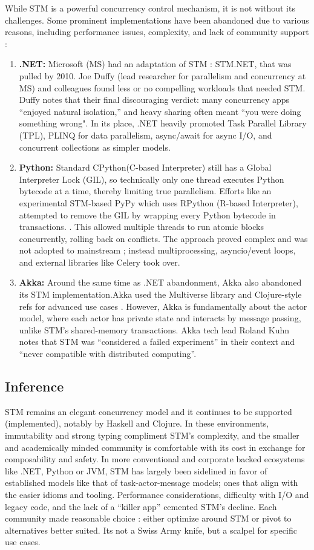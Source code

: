 While STM is a powerful concurrency control mechanism, it is not without its challenges. Some prominent implementations have been abandoned due to various reasons, including performance issues, complexity, and lack of community support :
\begin{enumerate}
    \item \textbf{.NET:}  Microsoft (MS) had an adaptation of STM :  STM.NET, that was pulled by 2010. Joe Duffy (lead researcher for parallelism and concurrency at MS) and colleagues found less or no compelling workloads that needed STM. Duffy notes that their final discouraging verdict: many concurrency apps “enjoyed natural isolation,” and heavy sharing often meant “you were doing something wrong"\cite{infoq.com}.  In its place, .NET heavily promoted Task Parallel Library (TPL), PLINQ for data parallelism, async/await for async I/O, and concurrent collections as simpler models.
    \item \textbf{Python:}  Standard CPython(C-based Interpreter) still has a Global Interpreter Lock (GIL), so technically only one thread executes Python bytecode at a time, thereby limiting true parallelism. Efforts like an experimental STM-based PyPy which uses RPython (R-based Interpreter), attempted to remove the GIL by wrapping every Python bytecode in transactions. \cite{pypy.org}. This allowed multiple threads to run atomic blocks concurrently, rolling back on conflicts. The approach proved complex and was not adopted to mainstream ; instead multiprocessing, asyncio/event loops, and external libraries like Celery took over.
    \item \textbf{Akka:} Around the same time as .NET abandonment, Akka also abandoned its STM implementation.Akka used the Multiverse library and Clojure-style refs for advanced use cases
    \cite{doc.akka.io}. However, Akka is fundamentally about the actor model, where each actor has private state and interacts by message passing, unlike STM’s shared-memory transactions. Akka tech lead Roland Kuhn notes that STM was “considered a failed experiment” in their context and “never compatible with distributed computing”.
\end{enumerate}

\subsection{Inference}

STM remains an elegant concurrency model and it continues to be supported (implemented), notably by Haskell and Clojure. In these environments, immutability and strong typing compliment STM’s complexity, and the smaller and academically minded community is comfortable with its cost in exchange for composability and safety. In more conventional and corporate backed ecosystems like .NET, Python or JVM, STM has largely been sidelined in favor of established models like that of task-actor-message models; ones that align with the easier idioms and tooling. Performance considerations, difficulty with I/O and legacy code, and the lack of a “killer app” cemented STM’s decline. Each community made reasonable choice : either optimize around STM or pivot to alternatives better suited. Its not a Swiss Army knife, but a scalpel for specific use cases.